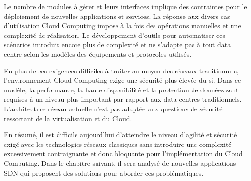 Le nombre de modules à gérer et leurs interfaces implique des contraintes pour le déploiement de nouvelles applications et services. La réponse aux divers cas d'utilisation Cloud Computing impose à la fois des opérations manuelles et une complexité de réalisation. Le développement d'outils pour automatiser ces scénarios introduit encore plus de complexité et ne s'adapte pas à tout data centre selon les modèles des équipements et protocoles utilisés.

En plus de ces exigences difficiles à traiter au moyen des réseaux traditionnels, l'environnement Cloud Computing exige une sécurité plus élevée du \gls{si}. Dans ce modèle, la performance, la haute disponibilité et la protection de données sont requises à un niveau plus important par rapport aux data centres traditionnels. L'architecture réseau actuelle n'est pas adaptée aux questions de sécurité ressortant de la virtualisation et du Cloud.

En résumé, il est difficile aujourd'hui d'atteindre le niveau d'agilité et sécurité exigé avec les technologies réseaux classiques sans introduire une complexité excessivement contraignante et donc bloquante pour l'implémentation du Cloud Computing. Dans le chapitre suivant, il sera analysé de nouvelles applications SDN qui proposent des solutions pour aborder ces problématiques. 